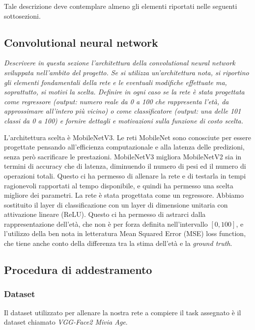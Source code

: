 Tale descrizione deve contemplare almeno gli elementi riportati nelle seguenti sottosezioni.

\subsection{Convolutional neural network}
\emph{Descrivere in questa sezione l’architettura della convolutional neural network
sviluppata nell’ambito del progetto. Se si utilizza un’architettura nota, si riportino gli elementi fondamentali della rete e le eventuali modifiche effettuate ma, soprattutto, si motivi la scelta.
Definire in ogni caso se la rete è stata progettata come regressore (output:
numero reale da 0 a 100 che rappresenta l’età, da approssimare all’intero più
vicino) o come classificatore (output: una delle 101 classi da 0 a 100) e fornire dettagli e motivazioni sulla funzione di costo scelta.}

L'architettura scelta è MobileNetV3. Le reti MobileNet sono conosciute per essere progettate pensando all'efficienza computazionale e alla latenza delle predizioni, senza però sacrificare le prestazioni. MobileNetV3 migliora MobileNetV2 sia in termini di accuracy che di latenza, diminuendo il numero di pesi ed il numero di operazioni totali. Questo ci ha permesso di allenare la rete e di testarla in tempi ragionevoli rapportati al tempo disponibile, e quindi ha permesso una scelta migliore dei parametri.
La rete è stata progettata come un regressore. Abbiamo sostituito il layer di classificazione con un layer di dimensione unitaria con attivazione lineare (ReLU). Questo ci ha permesso di astrarci dalla rappresentazione dell'età, che non è per forza definita nell'intervallo \([0, 100]\), e l'utilizzo della ben nota in letteratura Mean Squared Error (MSE) loss function, che tiene anche conto della differenza tra la stima dell'età e la \emph{ground truth}.

\subsection{Procedura di addestramento}
\subsubsection{Dataset}
\label{subsubsec:dataset}

Il dataset utilizzato per allenare la nostra rete a compiere il task assegnato è il dataset chiamato \emph{VGG-Face2 Mivia Age}.

